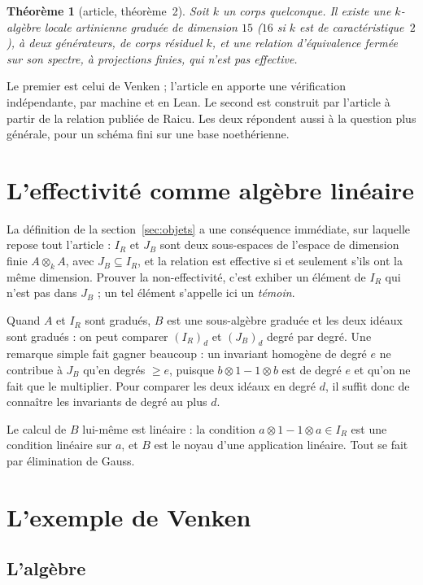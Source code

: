 \documentclass[11pt,a4paper]{amsart}
\theoremstyle{definition}
\theoremstyle{plain}
\newtheorem*{theoreme}{Théorème}
\theoremstyle{remark}
\begin{document}
\begin{theoreme}[article, théorème~2]
Soit $k$ un corps quelconque. Il existe une $k$-algèbre locale artinienne graduée de dimension $15$ ($16$ si $k$ est de caractéristique~$2$), à deux générateurs, de corps résiduel $k$, et une relation d'équivalence fermée sur son spectre, à projections finies, qui n'est pas effective.
\end{theoreme}

Le premier est celui de Venken ; l'article en apporte une vérification indépendante, par machine et en Lean. Le second est construit par l'article à partir de la relation publiée de Raicu. Les deux répondent aussi à la question plus générale, pour un schéma fini sur une base noethérienne.

\section{L'effectivité comme algèbre linéaire}\label{sec:lin}

La définition de la section~\ref{sec:objets} a une conséquence immédiate, sur laquelle repose tout l'article : $I_R$ et $J_B$ sont deux sous-espaces de l'espace de dimension finie $A \otimes_k A$, avec $J_B \subseteq I_R$, et la relation est effective si et seulement s'ils ont la même dimension. Prouver la non-effectivité, c'est exhiber un élément de $I_R$ qui n'est pas dans $J_B$ ; un tel élément s'appelle ici un \emph{témoin}.

Quand $A$ et $I_R$ sont gradués, $B$ est une sous-algèbre graduée et les deux idéaux sont gradués : on peut comparer $(I_R)_d$ et $(J_B)_d$ degré par degré. Une remarque simple fait gagner beaucoup : un invariant homogène de degré $e$ ne contribue à $J_B$ qu'en degrés $\ge e$, puisque $b \otimes 1 - 1 \otimes b$ est de degré $e$ et qu'on ne fait que le multiplier. Pour comparer les deux idéaux en degré $d$, il suffit donc de connaître les invariants de degré au plus $d$.

Le calcul de $B$ lui-même est linéaire : la condition $a \otimes 1 - 1 \otimes a \in I_R$ est une condition linéaire sur $a$, et $B$ est le noyau d'une application linéaire. Tout se fait par élimination de Gauss.

\section{L'exemple de Venken}\label{sec:venken}

\subsection{L'algèbre}
\end{document}
